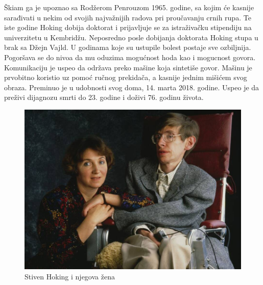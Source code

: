 \documentclass[a4paper, 12pt]{article}
\begin{document}
{Škiam ga je upoznao sa Rodžerom Penrouzom 1965. godine, sa kojim će kasnije sarađivati 
u nekim od svojih najvažnijih radova pri proučavanju crnih rupa. Te iste godine Hoking 
dobija doktorat i prijavljuje se za istraživačku stipendiju na univerzitetu u 
Kembridžu. Neposredno posle dobijanja doktorata Hoking stupa u brak sa Džejn Vajld. 
U godinama koje su ustupile bolest postaje sve ozbiljnija. Pogoršava se do nivoa da mu oduzima mogućnost hoda kao i mogucnost govora.
Komunikaciju je uspeo da održava preko mašine koja sintetiše govor. Mašinu je prvobitno koristio uz pomoć ručnog prekidača, 
a kasnije jednim mišićem svog obraza. Preminuo je u udobnosti svog doma, 14. marta 
2018. godine. Uspeo je da preživi dijagnozu smrti do 23. godine i doživi 76. 
godinu života. \cite{hawkingcom} \cite{famousscientists} 

\newpage
\begin{figure}[h!]
\begin{center}
\includegraphics[width=1.0\textwidth]{StivenHoking.jpeg}
\end{center}
\caption{Stiven Hoking i njegova žena}
\label{fig:Stiven Hoking}
\end{figure}

}
\end{document}
